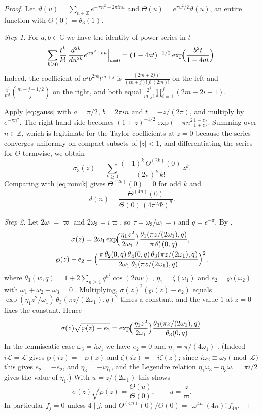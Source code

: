 \documentclass[11pt]{amsart}
\theoremstyle{definition}
\theoremstyle{remark}
\newcommand{\Z}{\mathbb{Z}}
\newcommand{\C}{\mathbb{C}}
\begin{document}
\begin{proof}
Let $\vartheta(u)=\sum_{n\in\Z}e^{-\pi n^2+2\pi inu}$ and $\Theta(u)=e^{\pi u^2/2}\vartheta(u)$, an
entire function with $\Theta(0)=\theta_3(1)$.

\emph{Step 1.} For $a,b\in\C$ we have the identity of power series in $t$
\begin{equation}\label{eq:gauss}
\sum_{k\ge0}\frac{t^k}{k!}\,\frac{d^{2k}}{du^{2k}}e^{au^2+bu}\Big|_{u=0}
=(1-4at)^{-1/2}\exp\!\Bigl(\frac{b^2t}{1-4at}\Bigr).
\end{equation}
Indeed, the coefficient of $a^jb^{2m}t^{m+j}$ is $\frac{(2m+2j)!}{(m+j)!\,j!\,(2m)!}$ on the left
and $\frac{4^j}{m!}\binom{m+j-1/2}{j}$ on the right, and both equal
$\frac{2^j}{m!\,j!}\prod_{i=1}^j(2m+2i-1)$.

Apply \eqref{eq:gauss} with $a=\pi/2$, $b=2\pi in$ and $t=-z/(2\pi)$, and multiply by
$e^{-\pi n^2}$. The right-hand side becomes
$(1+z)^{-1/2}\exp\bigl(-\pi n^2\frac{1-z}{1+z}\bigr)$. Summing over $n\in\Z$, which is legitimate
for the Taylor coefficients at $z=0$ because the series converges uniformly on compact subsets of
$|z|<1$, and differentiating the series for $\Theta$ termwise, we obtain
\[
\sigma_3(z)=\sum_{k\ge0}\frac{(-1)^k\,\Theta^{(2k)}(0)}{(2\pi)^k\,k!}\,z^k .
\]
Comparing with \eqref{eq:romik} gives $\Theta^{(2k)}(0)=0$ for odd $k$ and
\begin{equation}\label{eq:d-theta}
d(n)=\frac{\Theta^{(4n)}(0)}{\Theta(0)\,(4\pi^2\Phi)^n}.
\end{equation}

\emph{Step 2.} Let $2\omega_1=\varpi$ and $2\omega_3=i\varpi$, so $\tau=\omega_3/\omega_1=i$ and
$q=e^{-\pi}$. By \cite[(23.6.9), (23.6.6)]{DLMF},
\begin{align*}
\sigma(z)&=2\omega_1\exp\!\Bigl(\frac{\eta_1z^2}{2\omega_1}\Bigr)
\frac{\theta_1(\pi z/(2\omega_1),q)}{\pi\,\theta_1'(0,q)},\\
\wp(z)-e_2&=\Bigl(\frac{\pi\,\theta_2(0,q)\,\theta_4(0,q)\,\theta_3(\pi z/(2\omega_1),q)}
{2\omega_1\,\theta_1(\pi z/(2\omega_1),q)}\Bigr)^{2},
\end{align*}
where $\theta_3(w,q)=1+2\sum_{n\ge1}q^{n^2}\cos(2nw)$ \cite[(20.2.3)]{DLMF},
$\eta_1=\zeta(\omega_1)$ and $e_2=\wp(\omega_2)$ with $\omega_1+\omega_2+\omega_3=0$
\cite[(23.2.1), (23.2.12), (23.3.9)]{DLMF}. Multiplying, $\sigma(z)^2(\wp(z)-e_2)$ equals
$\exp(\eta_1z^2/\omega_1)\,\theta_3(\pi z/(2\omega_1),q)^2$ times a constant, and the value $1$
at $z=0$ fixes the constant. Hence
\[
\sigma(z)\sqrt{\wp(z)-e_2}=\exp\!\Bigl(\frac{\eta_1z^2}{2\omega_1}\Bigr)
\frac{\theta_3(\pi z/(2\omega_1),q)}{\theta_3(0,q)} .
\]
In the lemniscatic case $\omega_3=i\omega_1$ we have $e_2=0$ and $\eta_1=\pi/(4\omega_1)$
\cite[(23.5.2), (23.5.3)]{DLMF}. (Indeed $i\mathcal L=\mathcal L$ gives $\wp(iz)=-\wp(z)$ and
$\zeta(iz)=-i\zeta(z)$; since $i\omega_2\equiv\omega_2\pmod{\mathcal L}$ this gives $e_2=-e_2$, and
$\eta_3=-i\eta_1$, and the Legendre relation
$\eta_1\omega_3-\eta_3\omega_1=\pi i/2$ \cite[(23.2.14)]{DLMF} gives the value of $\eta_1$.) With
$u=z/(2\omega_1)$ this shows
\[
\sigma(z)\sqrt{\wp(z)}=\frac{\Theta(u)}{\Theta(0)},\qquad u=\frac{z}{\varpi}.
\]
In particular $f_j=0$ unless $4\mid j$, and
$\Theta^{(4n)}(0)/\Theta(0)=\varpi^{4n}(4n)!\,f_{4n}$.


\end{proof}
\end{document}

